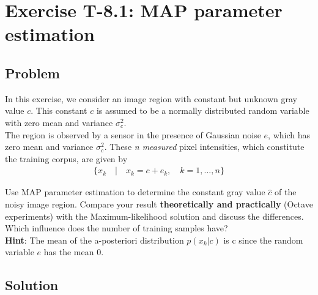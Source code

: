 \section*{Exercise T-8.1: MAP parameter estimation}

\subsection*{Problem}
In this exercise, we consider an image region with constant but unknown gray value $c$.
This constant $c$ is assumed to be a normally distributed random variable with zero mean and variance $\sigma_c^2$.\\

The region is observed by a sensor in the presence of Gaussian noise $e$, which has zero mean and variance $\sigma_c^2$.
These\textit{ n measured} pixel intensities, which constitute the training corpus, are given by
\begin{align*}
	\{x_k\quad |\quad x_k = c + e_k,\quad k = 1,...,n\}
\end{align*}

Use MAP parameter estimation to determine the constant gray value $\hat{c}$ of the noisy image region.
Compare your result \textbf{theoretically and practically} (Octave experiments) with the Maximum-likelihood solution and discuss the differences.
Which influence does the number of training samples have?\\

\textbf{Hint}: The mean of the a-posteriori distribution $p(x_k|c)$ is c since the random variable $e$ has the mean 0.

\subsection*{Solution}
